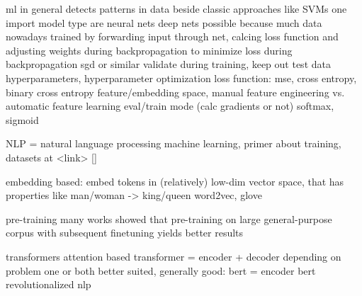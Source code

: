 ml in general detects patterns in data
beside classic approaches like SVMs one import model type are neural nets
deep nets possible because much data nowadays
trained by forwarding input through net, calcing loss function and adjusting weights during backpropagation to minimize loss
during backpropagation sgd or similar
validate during training, keep out test data
hyperparameters, hyperparameter optimization
loss function: mse, cross entropy, binary cross entropy
feature/embedding space, manual feature engineering vs. automatic feature learning
eval/train mode (calc gradients or not)
softmax, sigmoid





NLP = natural language processing
machine learning, primer about training, datasets at <link> []

embedding based: embed tokens in (relatively) low-dim vector space,
that has properties like man/woman -> king/queen
word2vec, glove

pre-training
many works showed that pre-training on large general-purpose corpus with
subsequent finetuning yields better results~\cite{}

transformers
attention based
transformer = encoder + decoder
depending on problem one or both better suited, generally good: bert = encoder
bert revolutionalized nlp
